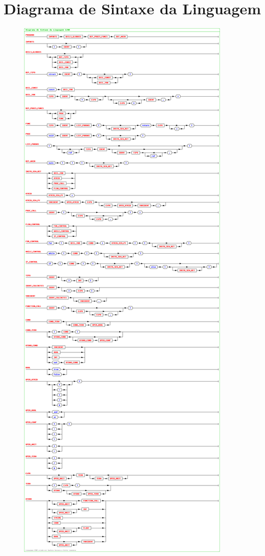 

\section{Diagrama de Sintaxe da Linguagem}
\label{sec:diagrama-sintaxe}

\begin{figure}[H]
	\centering 
	\includegraphics[width=\textwidth, clip, trim=0 1635px 0 0]{images/diagrama-sintaxe.png}  
	\label{fig:diagrama-sintaxe-1}
\end{figure}

